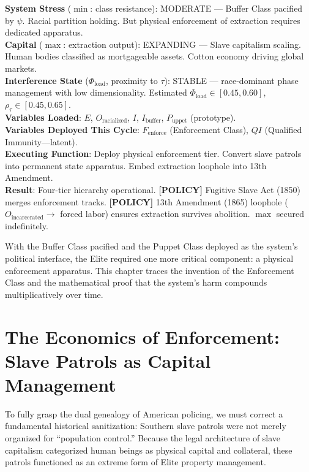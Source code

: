 \documentclass[12pt,openany]{book}
\begin{document}
\begin{tcolorbox}[colback=black!5, colframe=black!70, fonttitle=\bfseries\ttfamily, title=RUNTIME LOG: 1704--1865 (AMERICAN SOUTH)]
\ttfamily\small
\textbf{System Stress} ($\min$: class resistance): MODERATE --- Buffer Class pacified by $\psi$. Racial partition holding. But physical enforcement of extraction requires dedicated apparatus.\\
\textbf{Capital} ($\max$: extraction output): EXPANDING --- Slave capitalism scaling. Human bodies classified as mortgageable assets. Cotton economy driving global markets.\\
\textbf{Interference State} ($\Phi_{\text{load}}$, proximity to $\tau$): STABLE --- race-dominant phase management with low dimensionality. Estimated $\Phi_{\text{load}} \in [0.45, 0.60]$, $\rho_{\tau} \in [0.45, 0.65]$.\\
\textbf{Variables Loaded}: $E$, $O_{\text{racialized}}$, $I$, $I_{\text{buffer}}$, $P_{\text{uppet}}$ (prototype).\\
\textbf{Variables Deployed This Cycle}: $F_{\text{enforce}}$ (Enforcement Class), $QI$ (Qualified Immunity---latent).\\
\textbf{Executing Function}: Deploy physical enforcement tier. Convert slave patrols into permanent state apparatus. Embed extraction loophole into 13th Amendment.\\
\textbf{Result}: Four-tier hierarchy operational. \textbf{[POLICY]} Fugitive Slave Act (1850) merges enforcement tracks. \textbf{[POLICY]} 13th Amendment (1865) loophole ($O_{\text{incarcerated}} \rightarrow$ forced labor) ensures extraction survives abolition. $\max$ secured indefinitely.
\end{tcolorbox}

\medskip

With the Buffer Class pacified and the Puppet Class deployed as the system's political interface, the Elite required one more critical component: a physical enforcement apparatus. This chapter traces the invention of the Enforcement Class and the mathematical proof that the system's harm compounds multiplicatively over time.

\section{The Economics of Enforcement: Slave Patrols as Capital Management}

To fully grasp the dual genealogy of American policing, we must correct a fundamental historical sanitization: Southern slave patrols were not merely organized for ``population control.'' Because the legal architecture of slave capitalism categorized human beings as physical capital and collateral, these patrols functioned as an extreme form of Elite property management.
\end{document}

